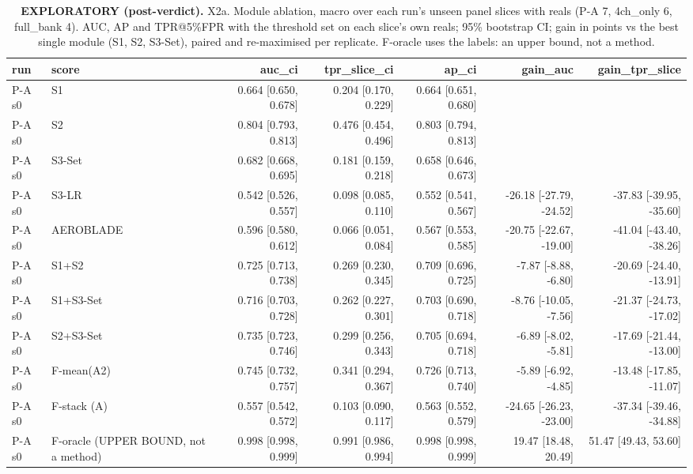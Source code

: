 \begin{table}[htbp]
\centering
\scriptsize
\caption{\textbf{EXPLORATORY (post-verdict).} X2a. Module ablation, macro over each run's unseen panel slices with reals (P-A 7, 4ch\_only 6, full\_bank 4). AUC, AP and TPR@5\%FPR with the threshold set on each slice's own reals; 95\% bootstrap CI; gain in points vs the best single module (S1, S2, S3-Set), paired and re-maximised per replicate. F-oracle uses the labels: an upper bound, not a method.}
\label{tab:x2a-macro}
\begin{tabular}{llrrrrr}
\toprule
run & score & auc\_ci & tpr\_slice\_ci & ap\_ci & gain\_auc & gain\_tpr\_slice \\
\midrule
P-A s0 & S1 & 0.664 [0.650, 0.678] & 0.204 [0.170, 0.229] & 0.664 [0.651, 0.680] &  &  \\
P-A s0 & S2 & 0.804 [0.793, 0.813] & 0.476 [0.454, 0.496] & 0.803 [0.794, 0.813] &  &  \\
P-A s0 & S3-Set & 0.682 [0.668, 0.695] & 0.181 [0.159, 0.218] & 0.658 [0.646, 0.673] &  &  \\
P-A s0 & S3-LR & 0.542 [0.526, 0.557] & 0.098 [0.085, 0.110] & 0.552 [0.541, 0.567] & -26.18 [-27.79, -24.52] & -37.83 [-39.95, -35.60] \\
P-A s0 & AEROBLADE & 0.596 [0.580, 0.612] & 0.066 [0.051, 0.084] & 0.567 [0.553, 0.585] & -20.75 [-22.67, -19.00] & -41.04 [-43.40, -38.26] \\
P-A s0 & S1+S2 & 0.725 [0.713, 0.738] & 0.269 [0.230, 0.345] & 0.709 [0.696, 0.725] & -7.87 [-8.88, -6.80] & -20.69 [-24.40, -13.91] \\
P-A s0 & S1+S3-Set & 0.716 [0.703, 0.728] & 0.262 [0.227, 0.301] & 0.703 [0.690, 0.718] & -8.76 [-10.05, -7.56] & -21.37 [-24.73, -17.02] \\
P-A s0 & S2+S3-Set & 0.735 [0.723, 0.746] & 0.299 [0.256, 0.343] & 0.705 [0.694, 0.718] & -6.89 [-8.02, -5.81] & -17.69 [-21.44, -13.00] \\
P-A s0 & F-mean(A2) & 0.745 [0.732, 0.757] & 0.341 [0.294, 0.367] & 0.726 [0.713, 0.740] & -5.89 [-6.92, -4.85] & -13.48 [-17.85, -11.07] \\
P-A s0 & F-stack (A) & 0.557 [0.542, 0.572] & 0.103 [0.090, 0.117] & 0.563 [0.552, 0.579] & -24.65 [-26.23, -23.00] & -37.34 [-39.46, -34.88] \\
P-A s0 & F-oracle (UPPER BOUND, not a method) & 0.998 [0.998, 0.999] & 0.991 [0.986, 0.994] & 0.998 [0.998, 0.999] & 19.47 [18.48, 20.49] & 51.47 [49.43, 53.60] \\

\end{tabular}
\end{table}
